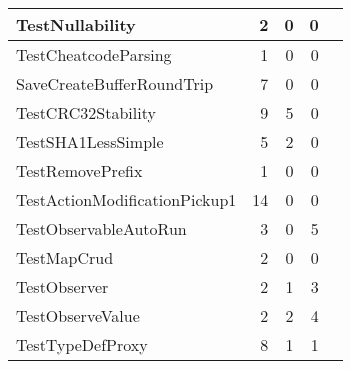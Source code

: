 \begin{table}
\begin{center}
{\begin{tabular}{|l|r|r|r|r|}
\hline
{TestNullability} & 2 & 0 & 0 \\
\hline
{TestCheatcodeParsing} & 1 & 0 & 0 \\
\hline
{SaveCreateBufferRoundTrip} & 7 & 0 & 0 \\
\hline
{TestCRC32Stability} & 9 & 5 & 0 \\
\hline
{TestSHA1LessSimple} & 5 & 2 & 0 \\
\hline
{TestRemovePrefix} & 1 & 0 & 0 \\
\hline
{TestActionModificationPickup1} & 14 & 0 & 0 \\
\hline
{TestObservableAutoRun} & 3 & 0 & 5 \\
\hline
{TestMapCrud} & 2 & 0 & 0 \\
\hline
{TestObserver} & 2 & 1 & 3 \\
\hline
{TestObserveValue} & 2 & 2 & 4 \\
\hline
{TestTypeDefProxy} & 8 & 1 & 1 \\
\hline

\end{tabular}
}
\end{center}
\label{tab:results2}
\end{table}